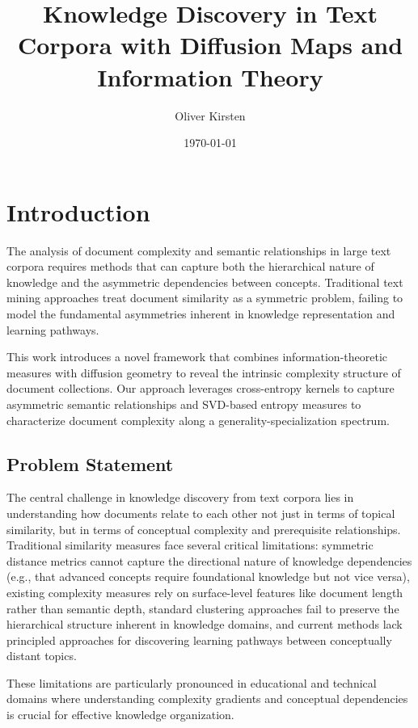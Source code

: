 \documentclass[12pt,a4paper]{article}
\title{Knowledge Discovery in Text Corpora with Diffusion Maps and Information Theory}
\author{Oliver Kirsten}
\date{\today}
\begin{document}
\maketitle

\section{Introduction}

The analysis of document complexity and semantic relationships in large text corpora requires methods that can capture both the hierarchical nature of knowledge and the asymmetric dependencies between concepts. Traditional text mining approaches treat document similarity as a symmetric problem, failing to model the fundamental asymmetries inherent in knowledge representation and learning pathways.

This work introduces a novel framework that combines information-theoretic measures with diffusion geometry to reveal the intrinsic complexity structure of document collections. Our approach leverages cross-entropy kernels to capture asymmetric semantic relationships and SVD-based entropy measures to characterize document complexity along a generality-specialization spectrum.

\subsection{Problem Statement}

The central challenge in knowledge discovery from text corpora lies in understanding how documents relate to each other not just in terms of topical similarity, but in terms of conceptual complexity and prerequisite relationships. Traditional similarity measures face several critical limitations: symmetric distance metrics cannot capture the directional nature of knowledge dependencies (e.g., that advanced concepts require foundational knowledge but not vice versa), existing complexity measures rely on surface-level features like document length rather than semantic depth, standard clustering approaches fail to preserve the hierarchical structure inherent in knowledge domains, and current methods lack principled approaches for discovering learning pathways between conceptually distant topics.

These limitations are particularly pronounced in educational and technical domains where understanding complexity gradients and conceptual dependencies is crucial for effective knowledge organization.
\end{document}
